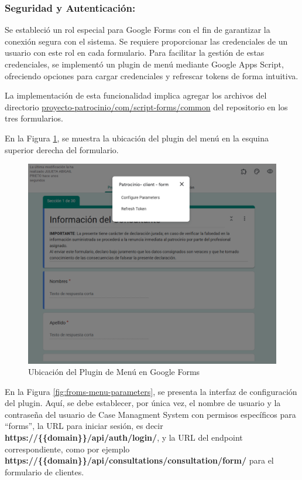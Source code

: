 \subsubsection{Seguridad y Autenticación:}\label{subsubsec:app-script-menu}
Se estableció un rol especial para Google Forms con el fin de garantizar la conexión segura con el sistema. Se requiere proporcionar las credenciales de un usuario con este rol en cada formulario. Para facilitar la gestión de estas credenciales, se implementó un plugin de menú mediante Google Apps Script, ofreciendo opciones para cargar credenciales y refrescar tokens de forma intuitiva.

La implementación de esta funcionalidad implica agregar los archivos del directorio \href{https://github.com/proyecto-patrocinio/proyecto-patrocinio/tree/main/com/script-forms/common}{proyecto-patrocinio/com/script-forms/common} del repositorio en los tres formularios.

En la Figura \ref{fig:forms-menu-1}, se muestra la ubicación del plugin del menú en la esquina superior derecha del formulario.

\begin{figure}[H]
    \centering
    \includegraphics[width=1\linewidth]{fig/forms-menu-2.png}
    \caption{Ubicación del Plugin de Menú en Google Forms}
    \label{fig:forms-menu-1}
\end{figure}

En la Figura \ref{fig:froms-menu-parameters}, se presenta la interfaz de configuración del plugin. Aquí, se debe establecer, por única vez, el nombre de usuario y la contraseña del usuario de Case Managment System con permisos específicos para ``forms'', la URL para iniciar sesión, es decir \textbf{https://\{\{domain\}\}/api/auth/login/}, y la URL del endpoint correspondiente, como por ejemplo \textbf{https://\{\{domain\}\}/api/consultations/consultation/form/} para el formulario de clientes.

